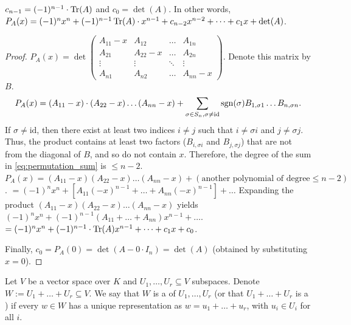 \begin{lemma}\label{lem:char_poly_coeffs}
  $c_{n-1} = (-1)^{n-1} \cdot \operatorname{Tr}(A)$ and $c_0 = \det(A)$. In other words, $P_A(x) = (-1)^n x^n + (-1)^{n-1}\operatorname{Tr}(A) \cdot x^{n-1} + c_{n-2}x^{n-2} + \dots + c_1 x + \det(A)$.
\end{lemma}

\begin{proof}
  $P_A(x) = \det\begin{pmatrix} A_{11}-x & A_{12} & \dots & A_{1n} \\ A_{21} & A_{22}-x & \dots & A_{2n} \\ \vdots & \vdots & \ddots & \vdots \\ A_{n1} & A_{n2} & \dots & A_{nn}-x \end{pmatrix}$. Denote this matrix by $B$.
  \begin{equation} \label{eq:permutation_sum}
    P_A(x) = (A_{11}-x) \cdot (A_{22}-x) \dots (A_{nn}-x) + \sum_{\sigma \in S_n, \sigma \ne \mathrm{id}} \operatorname{sgn}(\sigma) B_{1, \sigma 1} \dots B_{n, \sigma n}.
  \end{equation}
  If $\sigma \ne \mathrm{id}$, then there exist at least two indices $i \ne j$ such that $i \ne \sigma i$ and $j \ne \sigma j$.
  Thus, the product contains at least two factors ($B_{i, \sigma i}$ and $B_{j, \sigma j}$) that are not from the diagonal of $B$, and so do not contain $x$.
  Therefore, the degree of the sum in \eqref{eq:permutation_sum} is $\le n-2$.
  $P_A(x) = (A_{11}-x)(A_{22}-x) \dots (A_{nn}-x) + (\text{another polynomial of degree} \le n-2)$.
  $= (-1)^n x^n + \left[ A_{11}(-x)^{n-1} + \dots + A_{nn}(-x)^{n-1} \right] + \dots$
  Expanding the product $(A_{11}-x)(A_{22}-x) \dots (A_{nn}-x)$ yields $(-1)^n x^n + (-1)^{n-1}(A_{11} + \dots + A_{nn})x^{n-1} + \dots$.
  $= (-1)^n x^n + (-1)^{n-1} \cdot \operatorname{Tr}(A)x^{n-1} + \dots + c_1 x + c_0$.

  Finally, $c_0 = P_A(0) = \det(A - 0 \cdot I_n) = \det(A)$ (obtained by substituting $x=0$).
\end{proof}

\begin{definition}\label{def:direct_sum}
  Let $V$ be a vector space over $K$ and $U_1, \dots, U_r \subseteq V$ subspaces. Denote $W := U_1 + \dots + U_r \subseteq V$. We say that $W$ is a  of $U_1, \dots, U_r$ (or that $U_1 + \dots + U_r$ is a ) if every $w \in W$ has a unique representation as $w = u_1 + \dots + u_r$, with $u_i \in U_i$ for all $i$.
\end{definition}

